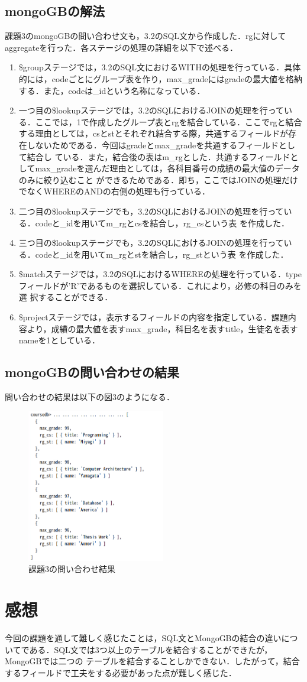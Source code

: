 \documentclass[dvipdfmx]{jarticle}
\begin{document}
\subsection{mongoGBの解法}
課題3のmongoGBの問い合わせ文も，3.2のSQL文から作成した．rgに対してaggregateを行った．各ステージの処理の詳細を以下で述べる．
\begin{enumerate}
    \item \$groupステージでは，3.2のSQL文におけるWITHの処理を行っている．具体的には，codeごとにグループ表を作り，max\_gradeにはgradeの最大値を格納
    する．また，codeは\_idという名称になっている．
    \item 一つ目の\$lookupステージでは，3.2のSQLにおけるJOINの処理を行っている．ここでは，1で作成したグループ表とrgを結合している．ここでrgと結合
    する理由としては，csとstとそれぞれ結合する際，共通するフィールドが存在しないためである．今回はgradeとmax\_gradeを共通するフィールドとして結合し
    ている．また，結合後の表はm\_rgとした．共通するフィールドとしてmax\_gradeを選んだ理由としては，各科目番号の成績の最大値のデータのみに絞り込むこと
    ができるためである．即ち，ここではJOINの処理だけでなくWHEREのANDの右側の処理も行っている．
    \item 二つ目の\$lookupステージでも，3.2のSQLにおけるJOINの処理を行っている．codeと\_idを用いてm\_rgとcsを結合し，rg\_csという表
    を作成した．
    \item 三つ目の\$lookupステージでも，3.2のSQLにおけるJOINの処理を行っている．codeと\_idを用いてm\_rgとstを結合し，rg\_stという表
    を作成した．
    \item \$matchステージでは，3.2のSQLにおけるWHEREの処理を行っている．typeフィールドが'R'であるものを選択している．これにより，必修の科目のみを選
    択することができる．
    \item \$projectステージでは，表示するフィールドの内容を指定している．課題内容より，成績の最大値を表すmax\_grade，科目名を表すtitle，生徒名を表す
    nameを1としている．
\end{enumerate}
\subsection{mongoGBの問い合わせの結果}
問い合わせの結果は以下の図3のようになる．
\begin{figure}[h]
    \centering
    \includegraphics[width=6cm]{mongo3_result.png}
    \caption{課題3の問い合わせ結果}
\end{figure}
\section{感想}
今回の課題を通して難しく感じたことは，SQL文とMongoGBの結合の違いについてである．SQL文では3つ以上のテーブルを結合することができたが，MongoGBでは二つの
テーブルを結合することしかできない．したがって，結合するフィールドで工夫をする必要があった点が難しく感じた．
\end{document}
